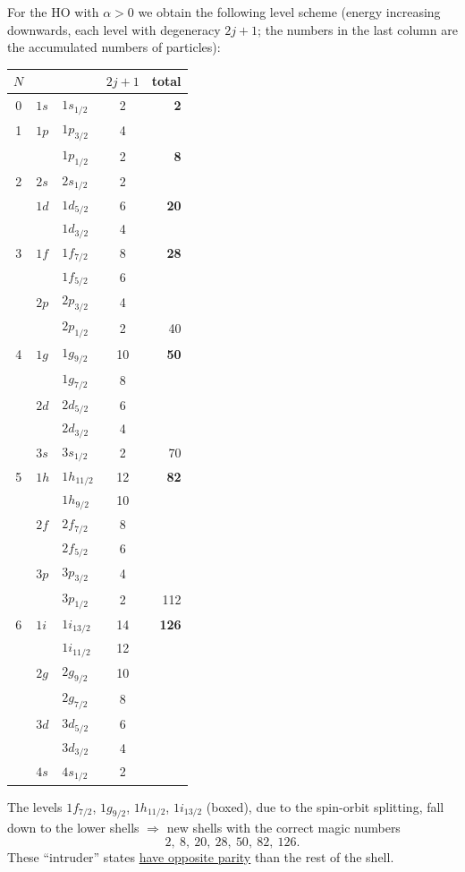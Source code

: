 \documentclass[11pt,a4paper]{article}
\begin{document}
For the HO with $\alpha>0$ we obtain the following level scheme (energy increasing downwards, each level with degeneracy $2j+1$; the numbers in the last column are the accumulated numbers of particles):
\begin{center}
\begin{tabular}{c l l c r}
$N$ & & & $2j+1$ & total\\ \hline
0 & $1s$ & $1s_{1/2}$ & 2 & \textbf{2} \\ \hline
1 & $1p$ & $1p_{3/2}$ & 4 & \\
  &      & $1p_{1/2}$ & 2 & \textbf{8} \\ \hline
2 & $2s$ & $2s_{1/2}$ & 2 & \\
  & $1d$ & $1d_{5/2}$ & 6 & \textbf{20}\\
  &      & $1d_{3/2}$ & 4 & \\ \hline
3 & $1f$ & $\boxed{1f_{7/2}}$ & 8 & \textbf{28}\\
  &      & $1f_{5/2}$ & 6 & \\
  & $2p$ & $2p_{3/2}$ & 4 & \\
  &      & $2p_{1/2}$ & 2 & 40 \\ \hline
4 & $1g$ & $\boxed{1g_{9/2}}$ & 10 & \textbf{50}\\
  &      & $1g_{7/2}$ & 8 & \\
  & $2d$ & $2d_{5/2}$ & 6 & \\
  &      & $2d_{3/2}$ & 4 & \\
  & $3s$ & $3s_{1/2}$ & 2 & 70\\ \hline
5 & $1h$ & $\boxed{1h_{11/2}}$ & 12 & \textbf{82}\\
  &      & $1h_{9/2}$ & 10 & \\
  & $2f$ & $2f_{7/2}$ & 8 & \\
  &      & $2f_{5/2}$ & 6 & \\
  & $3p$ & $3p_{3/2}$ & 4 & \\
  &      & $3p_{1/2}$ & 2 & 112\\ \hline
6 & $1i$ & $\boxed{1i_{13/2}}$ & 14 & \textbf{126}\\
  &      & $1i_{11/2}$ & 12 & \\
  & $2g$ & $2g_{9/2}$ & 10 & \\
  &      & $2g_{7/2}$ & 8 & \\
  & $3d$ & $3d_{5/2}$ & 6 & \\
  &      & $3d_{3/2}$ & 4 & \\
  & $4s$ & $4s_{1/2}$ & 2 & \\ \hline
\end{tabular}
\end{center}
The levels $1f_{7/2}$, $1g_{9/2}$, $1h_{11/2}$, $1i_{13/2}$ (boxed), due to the spin-orbit splitting, fall down to the lower shells $\Rightarrow$ new shells with the correct magic numbers
\[
2,\ 8,\ 20,\ 28,\ 50,\ 82,\ 126 .
\]
These ``intruder'' states \underline{have opposite parity} than the rest of the shell.
\end{document}
